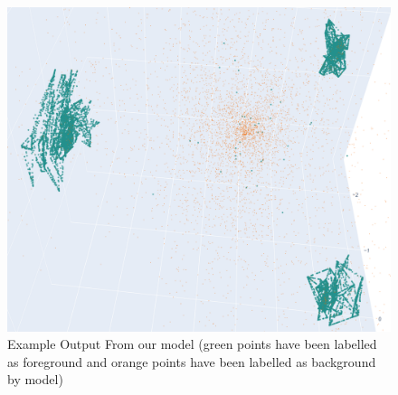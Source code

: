     \begin{figure}
        \centering
        \includegraphics[width=0.9\linewidth]{images/result.png}
        \caption{Example Output From our model (green points have been labelled as foreground and orange points have been labelled as background by model)}
        \label{fig:result}
    \end{figure}
